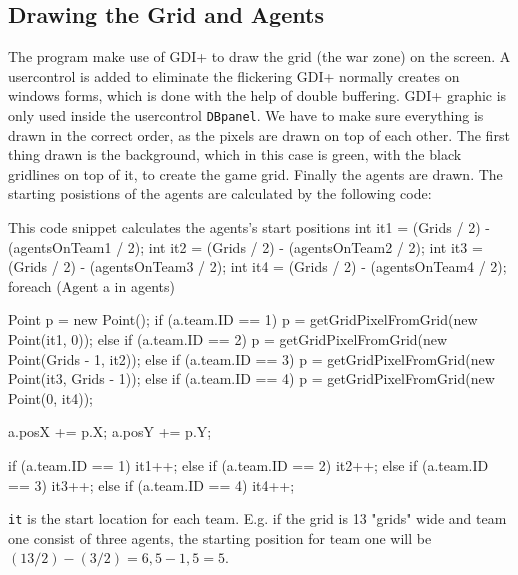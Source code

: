 \subsection*{Drawing the Grid and Agents}
\label{sec:drawing}
The program make use of GDI+ \cite{misc:gdiplus} to draw the grid (the war zone) on the screen. A usercontrol is added to eliminate the flickering GDI+ normally creates on windows forms, which is done with the help of double buffering.
GDI+ graphic is only used inside the usercontrol \texttt{DBpanel}. We have to make sure everything is drawn in the correct order, as the pixels are drawn on top of each other. The first thing drawn is the background, which in this case is green, with the black gridlines on top of it, to create the game grid. Finally the agents are drawn.
The starting posistions of the agents are calculated by the following code:
\begin{source}{This code snippet calculates the agents's start positions}{}                 
            int it1 = (Grids / 2) - (agentsOnTeam1 / 2);
            int it2 = (Grids / 2) - (agentsOnTeam2 / 2);
            int it3 = (Grids / 2) - (agentsOnTeam3 / 2);
            int it4 = (Grids / 2) - (agentsOnTeam4 / 2);
            foreach (Agent a in agents)
            {
                Point p = new Point();
                if (a.team.ID == 1)
                {
                    p = getGridPixelFromGrid(new Point(it1, 0));
                }
                else if (a.team.ID == 2)
                {
                    p = getGridPixelFromGrid(new Point(Grids - 1, it2));
                }
                else if (a.team.ID == 3)
                {
                    p = getGridPixelFromGrid(new Point(it3, Grids - 1));
                }
                else if (a.team.ID == 4)
                {
                    p = getGridPixelFromGrid(new Point(0, it4));
                }

                a.posX += p.X;
                a.posY += p.Y;

                if (a.team.ID == 1)
                {
                    it1++;
                }
                else if (a.team.ID == 2)
                {
                    it2++;
                }
                else if (a.team.ID == 3)
                {
                    it3++;
                }
                else if (a.team.ID == 4)
                {
                    it4++;
                }
            }
\end{source}
\texttt{it} is the start location for each team. E.g. if the grid is 13 "grids" wide and team one consist of three agents, the starting position for team one will be $(13/2) - (3 / 2) = 6,5 - 1,5 = 5$.
